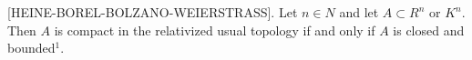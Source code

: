 [HEINE-BOREL-BOLZANO-WEIERSTRASS]. Let $n \in N$ and let $A \subset R^n$ or $K^n$. Then $A$ is compact in the relativized usual topology if and only if $A$ is closed and bounded$^1$.